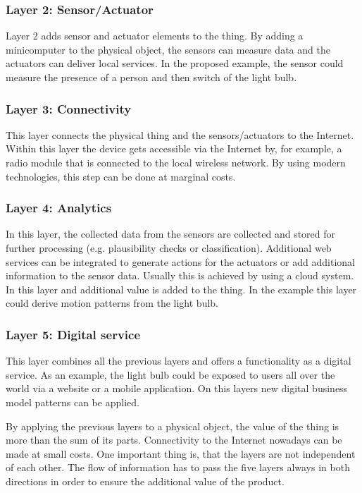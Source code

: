\subsubsection{Layer 2: Sensor/Actuator}
Layer 2 adds sensor and actuator elements to the thing. By adding a minicomputer to the physical object, the sensors can measure data and the actuators can deliver local services. In the proposed example, the sensor could measure the presence of a person and then switch of the light bulb.

\subsubsection{Layer 3: Connectivity}
This layer connects the physical thing and the sensors/actuators to the Internet. Within this layer the device gets accessible via the Internet by, for example, a radio module that is connected to the local wireless network. By using modern technologies, this step can be done at marginal costs.

\subsubsection{Layer 4: Analytics}
In this layer, the collected data from the sensors are collected and stored for further processing (e.g. plausibility checks or classification). Additional web services can be integrated to generate actions for the actuators or add additional information to the sensor data. Usually this is achieved by using a cloud system. In this layer and additional value is added to the  thing. In the example this layer could derive motion patterns from the light bulb.

\subsubsection{Layer 5: Digital service}
This layer combines all the previous layers and offers a functionality as a digital service. As an example, the light bulb could be exposed to users all over the world via a website or a mobile application. On this layers new digital business model patterns can be applied.

By applying the previous layers to a physical object, the value of the thing is more than the sum of its parts. Connectivity to the Internet nowadays can be made at small costs. One important thing is, that the layers are not independent of each other. The flow of information has to pass the five layers always in both directions in order to ensure the additional value of the product.

